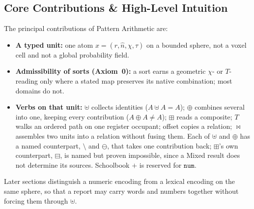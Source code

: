 \documentclass[12pt, a4paper]{article}
\begin{document}
\subsection{Core Contributions \& High-Level Intuition}
The principal contributions of Pattern Arithmetic are:
\begin{itemize}
    \item \textbf{A typed unit:} one atom $x=(r,\hat n,\chi,\tau)$ on a bounded sphere, not a voxel cell and not a global probability field.
    \item \textbf{Admissibility of sorts (Axiom~0):} a sort earns a geometric $\chi$- or $T$-reading only where a stated map preserves its native combination; most domains do not.
    \item \textbf{Verbs on that unit:} $\uplus$ collects identities ($A\uplus A=A$); $\oplus$ combines several into one, keeping every contribution ($A\oplus A\ne A$); $\boxplus$ reads a composite; $T$ walks an ordered path on one register occupant; offset copies a relation; $\bowtie$ assembles two units into a relation without fusing them. Each of $\uplus$ and $\oplus$ has a named counterpart, $\setminus$ and $\ominus$, that takes one contribution back; $\boxplus$'s own counterpart, $\boxminus$, is named but proven impossible, since a Mixed result does not determine its sources. Schoolbook $+$ is reserved for $\mathtt{num}$.
\end{itemize}

Later sections distinguish a numeric encoding from a lexical encoding on the same sphere, so that a report may carry words and numbers together without forcing them through $\uplus$.
\end{document}
